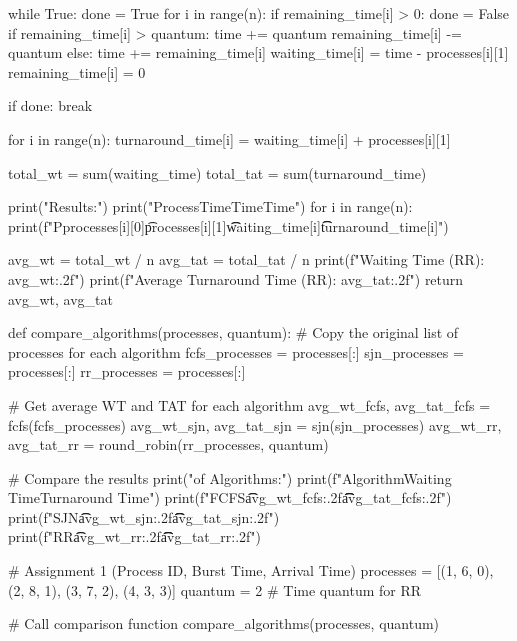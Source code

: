 \documentclass[12pt]{article}
\begin{document}
\begin{python}
    while True:
        done = True
        for i in range(n):
            if remaining_time[i] > 0:
                done = False
                if remaining_time[i] > quantum:
                    time += quantum
                    remaining_time[i] -= quantum
                else:
                    time += remaining_time[i]
                    waiting_time[i] = time - processes[i][1]
                    remaining_time[i] = 0
        
        if done:
            break
    
    for i in range(n):
        turnaround_time[i] = waiting_time[i] + processes[i][1]
    
    total_wt = sum(waiting_time)
    total_tat = sum(turnaround_time)
    
    print("\nRR Results:")
    print("Process\tBurst Time\tWaiting Time\tTurnaround Time")
    for i in range(n):
        print(f"P{processes[i][0]}\t{processes[i][1]}\t\t{waiting_time[i]}\t\t{turnaround_time[i]}")
    
    avg_wt = total_wt / n
    avg_tat = total_tat / n
    print(f"\nAverage Waiting Time (RR): {avg_wt:.2f}")
    print(f"Average Turnaround Time (RR): {avg_tat:.2f}")
    return avg_wt, avg_tat

def compare_algorithms(processes, quantum):
    # Copy the original list of processes for each algorithm
    fcfs_processes = processes[:]
    sjn_processes = processes[:]
    rr_processes = processes[:]
    
    # Get average WT and TAT for each algorithm
    avg_wt_fcfs, avg_tat_fcfs = fcfs(fcfs_processes)
    avg_wt_sjn, avg_tat_sjn = sjn(sjn_processes)
    avg_wt_rr, avg_tat_rr = round_robin(rr_processes, quantum)
    
    # Compare the results
    print("\nComparison of Algorithms:")
    print(f"Algorithm\tAverage Waiting Time\tAverage Turnaround Time")
    print(f"FCFS\t\t{avg_wt_fcfs:.2f}\t\t\t{avg_tat_fcfs:.2f}")
    print(f"SJN\t\t{avg_wt_sjn:.2f}\t\t\t{avg_tat_sjn:.2f}")
    print(f"RR\t\t{avg_wt_rr:.2f}\t\t\t{avg_tat_rr:.2f}")

# Assignment 1 (Process ID, Burst Time, Arrival Time)
processes = [(1, 6, 0), (2, 8, 1), (3, 7, 2), (4, 3, 3)]  
quantum = 2  # Time quantum for RR

# Call comparison function
compare_algorithms(processes, quantum)
\end{python}
\end{document}
